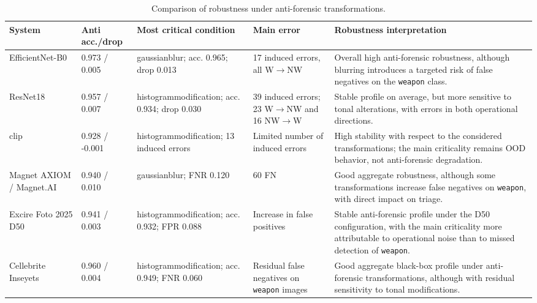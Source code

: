 \begin{table}[H]
\centering
\caption{Comparison of robustness under anti-forensic transformations.}
\label{tab:results-comparative-antiforensic}
\small
\renewcommand{\arraystretch}{1.18}
\setlength{\tabcolsep}{3pt}
\begin{tabularx}{\textwidth}{@{}p{2.7cm} p{1.8cm} p{3.1cm} p{2.8cm} X@{}}
\toprule
\textbf{System} &
\textbf{Anti acc./drop} &
\textbf{Most critical condition} &
\textbf{Main error} &
\textbf{Robustness interpretation} \\
\midrule

EfficientNet-B0 &
0.973 / 0.005 &
\gls{gaussianblur}; acc. 0.965; drop 0.013 &
17 induced errors, all W$\rightarrow$NW &
Overall high anti-forensic robustness, although blurring introduces a targeted
risk of false negatives on the \texttt{weapon} class. \\

ResNet18 &
0.957 / 0.007 &
\gls{histogrammodification}; acc. 0.934; drop 0.030 &
39 induced errors; 23 W$\rightarrow$NW and 16 NW$\rightarrow$W &
Stable profile on average, but more sensitive to tonal alterations, with errors
in both operational directions. \\

\gls{clip} &
0.928 / -0.001 &
\gls{histogrammodification}; 13 induced errors &
Limited number of induced errors &
High stability with respect to the considered transformations; the main
criticality remains OOD behavior, not anti-forensic degradation. \\

Magnet AXIOM / Magnet.AI &
0.940 / 0.010 &
\gls{gaussianblur}; FNR 0.120 &
60 FN &
Good aggregate robustness, although some transformations increase false
negatives on \texttt{weapon}, with direct impact on triage. \\

Excire Foto 2025 D50 &
0.941 / 0.003 &
\gls{histogrammodification}; acc. 0.932; FPR 0.088 &
Increase in false positives &
Stable anti-forensic profile under the D50 configuration, with the main
criticality more attributable to operational noise than to missed detection of
\texttt{weapon}. \\

Cellebrite Inseyets &
0.960 / 0.004 &
\gls{histogrammodification}; acc. 0.949; FNR 0.060 &
Residual false negatives on \texttt{weapon} images &
Good aggregate black-box profile under anti-forensic transformations, although
with residual sensitivity to tonal modifications. \\


\end{tabularx}
\end{table}
